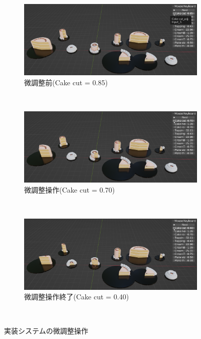 \begin{figure}
  \centering
  \begin{subfigure}{1\linewidth}
    \centering
    \includegraphics[scale=0.33]{./imgs/systemUse/adj0.png}
    \caption{微調整前(Cake cut = 0.85)}\label{fig:sOV_adj0}
  \end{subfigure}\\
  \begin{subfigure}{1\linewidth}
    \centering
    \includegraphics[scale=0.33]{./imgs/systemUse/adj1.png}
    \caption{微調整操作(Cake cut = 0.70)}\label{fig:sOV_adj1}
  \end{subfigure}\\
  \begin{subfigure}{1\linewidth}
    \centering
    \includegraphics[scale=0.33]{./imgs/systemUse/adj3.png}
    \caption{微調整操作終了(Cake cut = 0.40)}\label{fig:sOV_adj2}
  \end{subfigure}\\
  \caption{実装システムの微調整操作}\label{fig:systemOverViewAdj}
\end{figure}
